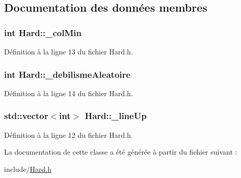 \subsection{Documentation des données membres}
\hypertarget{a00010_a5e05a5d847e4543162fd7ba5ebbce233}{
\subsubsection[{\_\-colMin}]{\setlength{\rightskip}{0pt plus 5cm}int {\bf Hard::\_\-colMin}}}
\label{a00010_a5e05a5d847e4543162fd7ba5ebbce233}


Définition à la ligne 13 du fichier Hard.h.

\hypertarget{a00010_a40a101537ee79d41b6e7b4f78986050d}{
\subsubsection[{\_\-debilismeAleatoire}]{\setlength{\rightskip}{0pt plus 5cm}int {\bf Hard::\_\-debilismeAleatoire}}}
\label{a00010_a40a101537ee79d41b6e7b4f78986050d}


Définition à la ligne 14 du fichier Hard.h.

\hypertarget{a00010_a77f3d26a1e2b3c98e8e0ec513fc57112}{
\subsubsection[{\_\-lineUp}]{\setlength{\rightskip}{0pt plus 5cm}std::vector$<$int$>$ {\bf Hard::\_\-lineUp}}}
\label{a00010_a77f3d26a1e2b3c98e8e0ec513fc57112}


Définition à la ligne 12 du fichier Hard.h.



La documentation de cette classe a été générée à partir du fichier suivant :\begin{DoxyCompactItemize}
\item 
include/\hyperlink{a00027}{Hard.h}\end{DoxyCompactItemize}
